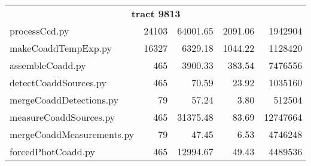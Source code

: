 \begin{table}
\begin{center}
\begin{tabular}{lrrrr}
        \hline
        \multicolumn{5}{c}{\textbf{tract 9813}} \\
        processCcd.py & 24103 & 64001.65 & 2091.06 &   1942904 \\
        makeCoaddTempExp.py & 16327 & 6329.18 & 1044.22 &  1128420 \\
        assembleCoadd.py & 465 & 3900.33 & 383.54 &   7476556 \\
        detectCoaddSources.py & 465 & 70.59 & 23.92 & 1035160 \\
        mergeCoaddDetections.py & 79 & 57.24 & 3.80 &   512504 \\
        measureCoaddSources.py & 465 & 31375.48 & 83.69 & 12747664 \\
        mergeCoaddMeasurements.py & 79 &  47.45 & 6.53 &   4746248 \\
        forcedPhotCoadd.py & 465 & 12994.67 & 49.43 &   4489536 \\
        \hline\hline
    \end{tabular}
    \end{center}
\end{table}
